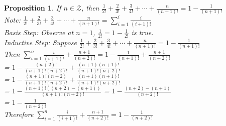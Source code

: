 \documentclass{article}
\newtheorem*{theorem}{Proposition}
\begin{document}
\begin{theorem}
    If \(n \in \mathcal{Z}\), then \(\frac{1}{2!} + \frac{2}{3!} + \frac{3}{4!} + \cdots + \frac{n}{(n+1)!} = 1 - \frac{1}{(n + 1)!}\) \\
    Note: \(\frac{1}{2!} + \frac{2}{3!} + \frac{3}{4!} + \cdots + \frac{n}{(n+1)!} = \sum_{i=1}^{i}{\frac{i}{(i+1)!}}\) \\
    Basis Step: Observe at \(n = 1\), \(\frac{1}{2!} = 1 - \frac{1}{2!}\) is true. \\
    Inductive Step: Suppose \(\frac{1}{2!} + \frac{2}{3!} + \frac{3}{4!} + \cdots + \frac{n}{(n+1)!} = 1 - \frac{1}{(n + 1)!}\) \\
    Then \(\sum_{i=1}^{n}{\frac{i}{(i+1)!}} + \frac{n+1}{(n+2)!} = 1-\frac{1}{(n+1)!} + \frac{n+1}{(n+2)!}\) \\
    = \(1 - \frac{(n+2)!}{(n+1)!(n+2)!} + \frac{(n+1)(n+1)!}{(n+1)!(n+2)!}\) \\
    = \(1 - \frac{(n+1)!(n+2)}{(n+1)!(n+2)!} + \frac{(n+1)(n+1)!}{(n+1)!(n+2)!}\) \\
    = \(1 - \frac{(n+1)!((n+2)-(n+1))}{(n+1)!(n+2)!}\) = \(1 - \frac{(n+2)-(n+1)}{(n+2)!}\) \\
    = \(1 - \frac{1}{(n+2)!}\) \\
    Therefore \(\sum_{i=1}^{n}{\frac{i}{(i+1)!}} + \frac{n+1}{(n+2)!} = 1 - \frac{1}{(n+2)!}\)
\end{theorem}
\end{document}
